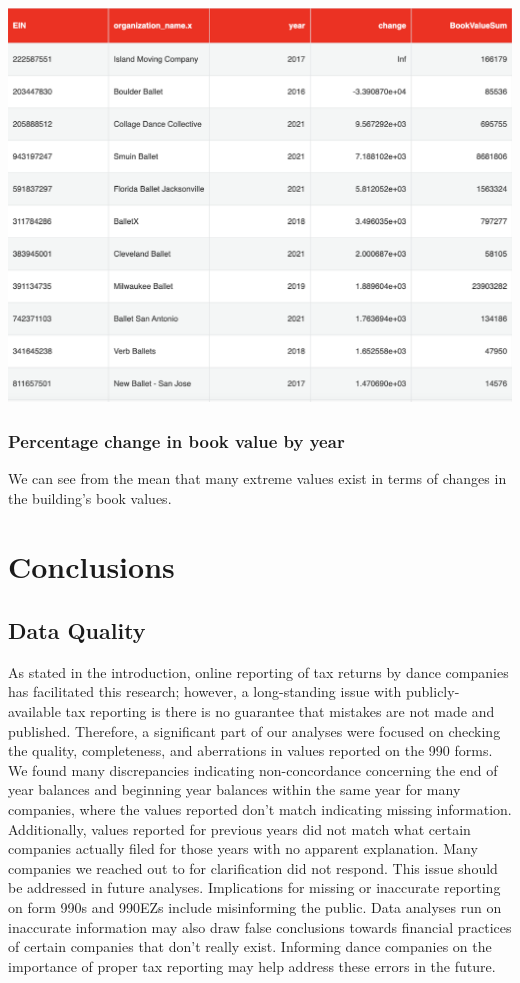 \documentclass[Dance Data
Project,article,submit,moreauthors,pdftex]{mdpi}
\begin{document}
\includegraphics[width=0.6\linewidth,]{../images/percent_change_ranking}

\hypertarget{percentage-change-in-book-value-by-year}{%
\subsubsection{Percentage change in book value by
year}\label{percentage-change-in-book-value-by-year}}

We can see from the mean that many extreme values exist in terms of
changes in the building's book values.

\hypertarget{conclusions}{%
\section{Conclusions}\label{conclusions}}

\hypertarget{data-quality}{%
\subsection{Data Quality}\label{data-quality}}

As stated in the introduction, online reporting of tax returns by dance
companies has facilitated this research; however, a long-standing issue
with publicly-available tax reporting is there is no guarantee that
mistakes are not made and published. Therefore, a significant part of
our analyses were focused on checking the quality, completeness, and
aberrations in values reported on the 990 forms. We found many
discrepancies indicating non-concordance concerning the end of year
balances and beginning year balances within the same year for many
companies, where the values reported don't match indicating missing
information. Additionally, values reported for previous years did not
match what certain companies actually filed for those years with no
apparent explanation. Many companies we reached out to for clarification
did not respond. This issue should be addressed in future analyses.
Implications for missing or inaccurate reporting on form 990s and 990EZs
include misinforming the public. Data analyses run on inaccurate
information may also draw false conclusions towards financial practices
of certain companies that don't really exist. Informing dance companies
on the importance of proper tax reporting may help address these errors
in the future.
\end{document}
